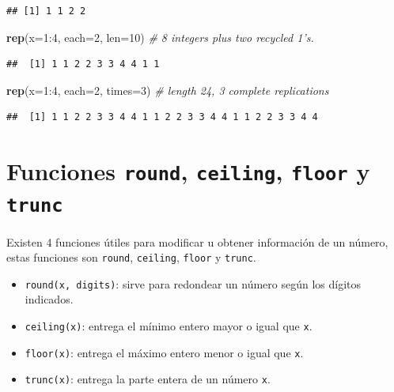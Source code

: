 \documentclass[10pt,]{krantz}
\makeatletter
\newenvironment{Shaded}{\begin{snugshade}}{\end{snugshade}}
\newcommand{\KeywordTok}[1]{\textcolor[rgb]{0.13,0.29,0.53}{\textbf{{#1}}}}
\newcommand{\DataTypeTok}[1]{\textcolor[rgb]{0.13,0.29,0.53}{{#1}}}
\newcommand{\DecValTok}[1]{\textcolor[rgb]{0.00,0.00,0.81}{{#1}}}
\newcommand{\CommentTok}[1]{\textcolor[rgb]{0.56,0.35,0.01}{\textit{{#1}}}}
\newcommand{\NormalTok}[1]{{#1}}
\providecommand{\tightlist}{%
  \setlength{\itemsep}{0pt}\setlength{\parskip}{0pt}}
\newenvironment{kframe}{%
\medskip{}
\setlength{\fboxsep}{.8em}
 \def\at@end@of@kframe{}%
 \ifinner\ifhmode%
  \def\at@end@of@kframe{\end{minipage}}%
  \begin{minipage}{\columnwidth}%
 \fi\fi%
 \def\FrameCommand##1{\hskip\@totalleftmargin \hskip-\fboxsep
 \colorbox{shadecolor}{##1}\hskip-\fboxsep
     \hskip-\linewidth \hskip-\@totalleftmargin \hskip\columnwidth}%
 \MakeFramed {\advance\hsize-\width
   \@totalleftmargin\z@ \linewidth\hsize
   \@setminipage}}%
 {\par\unskip\endMakeFramed%
 \at@end@of@kframe}
\renewenvironment{Shaded}{\begin{kframe}}{\end{kframe}}
\makeatother
\begin{document}
\begin{verbatim}
## [1] 1 1 2 2
\end{verbatim}

\begin{Shaded}
\begin{Highlighting}[]
\KeywordTok{rep}\NormalTok{(}\DataTypeTok{x=}\DecValTok{1}\NormalTok{:}\DecValTok{4}\NormalTok{, }\DataTypeTok{each=}\DecValTok{2}\NormalTok{, }\DataTypeTok{len=}\DecValTok{10}\NormalTok{)   }\CommentTok{# 8 integers plus two recycled 1's.}
\end{Highlighting}
\end{Shaded}

\begin{verbatim}
##  [1] 1 1 2 2 3 3 4 4 1 1
\end{verbatim}

\begin{Shaded}
\begin{Highlighting}[]
\KeywordTok{rep}\NormalTok{(}\DataTypeTok{x=}\DecValTok{1}\NormalTok{:}\DecValTok{4}\NormalTok{, }\DataTypeTok{each=}\DecValTok{2}\NormalTok{, }\DataTypeTok{times=}\DecValTok{3}\NormalTok{)  }\CommentTok{# length 24, 3 complete replications}
\end{Highlighting}
\end{Shaded}

\begin{verbatim}
##  [1] 1 1 2 2 3 3 4 4 1 1 2 2 3 3 4 4 1 1 2 2 3 3 4 4
\end{verbatim}

\section{\texorpdfstring{Funciones \texttt{round}, \texttt{ceiling},
\texttt{floor} y \texttt{trunc}  
}{Funciones round, ceiling, floor y trunc    }}\label{funciones-round-ceiling-floor-y-trunc}

Existen 4 funciones útiles para modificar u obtener información de un
número, estas funciones son \texttt{round}, \texttt{ceiling},
\texttt{floor} y \texttt{trunc}.

\begin{itemize}
\tightlist
\item
  \texttt{round(x,\ digits)}: sirve para redondear un número según los
  dígitos indicados.
\item
  \texttt{ceiling(x)}: entrega el mínimo entero mayor o igual que
  \texttt{x}.
\item
  \texttt{floor(x)}: entrega el máximo entero menor o igual que
  \texttt{x}.
\item
  \texttt{trunc(x)}: entrega la parte entera de un número \texttt{x}.
\end{itemize}
\end{document}
